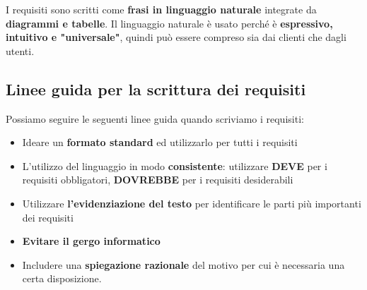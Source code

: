 \documentclass[12pt]{article}
\begin{document}
I requisiti sono scritti come \textbf{frasi in linguaggio naturale} integrate da \textbf{diagrammi e tabelle}.
Il linguaggio naturale è usato perché è \textbf{espressivo, intuitivo e "universale"}, quindi può essere compreso sia dai clienti che dagli utenti.
\subsection{Linee guida per la scrittura dei requisiti}
Possiamo seguire le seguenti linee guida quando scriviamo i requisiti:
\begin{itemize}
    \item Ideare un \textbf{formato standard} ed utilizzarlo per tutti i requisiti
    \item L'utilizzo del linguaggio in modo \textbf{consistente}: utilizzare \textbf{DEVE} per i requisiti obbligatori, \textbf{DOVREBBE} per i requisiti desiderabili
    \item Utilizzare \textbf{l'evidenziazione del testo} per identificare le parti più importanti dei requisiti
    \item \textbf{Evitare il gergo informatico}
    \item Includere una \textbf{spiegazione razionale} del motivo per cui è necessaria una certa disposizione.
\end{itemize}
\end{document}
